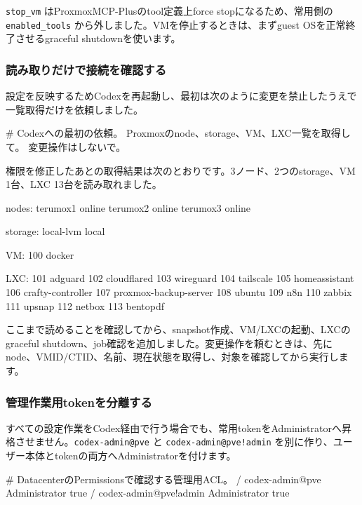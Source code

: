 \texttt{stop\_vm} はProxmoxMCP-Plusのtool定義上force stopになるため、常用側の \texttt{enabled\_tools} から外しました。VMを停止するときは、まずguest OSを正常終了させるgraceful shutdownを使います。

\subsubsection*{読み取りだけで接続を確認する}

設定を反映するためCodexを再起動し、最初は次のように変更を禁止したうえで一覧取得だけを依頼しました。

\begin{commands}
# Codexへの最初の依頼。
Proxmoxのnode、storage、VM、LXC一覧を取得して。
変更操作はしないで。
\end{commands}

権限を修正したあとの取得結果は次のとおりです。3ノード、2つのstorage、VM 1台、LXC 13台を読み取れました。

\begin{commands}
nodes:
terumox1 online
terumox2 online
terumox3 online

storage:
local-lvm
local

VM:
100 docker

LXC:
101 adguard
102 cloudflared
103 wireguard
104 tailscale
105 homeassistant
106 crafty-controller
107 proxmox-backup-server
108 ubuntu
109 n8n
110 zabbix
111 upsnap
112 netbox
113 bentopdf
\end{commands}

ここまで読めることを確認してから、snapshot作成、VM/LXCの起動、LXCのgraceful shutdown、job確認を追加しました。変更操作を頼むときは、先にnode、VMID/CTID、名前、現在状態を取得し、対象を確認してから実行します。

\subsubsection*{管理作業用tokenを分離する}

すべての設定作業をCodex経由で行う場合でも、常用tokenをAdministratorへ昇格させません。\texttt{codex-admin@pve} と \texttt{codex-admin@pve!admin} を別に作り、ユーザー本体とtokenの両方へAdministratorを付けます。

\begin{commands}
# DatacenterのPermissionsで確認する管理用ACL。
/  codex-admin@pve        Administrator  true
/  codex-admin@pve!admin  Administrator  true
\end{commands}

